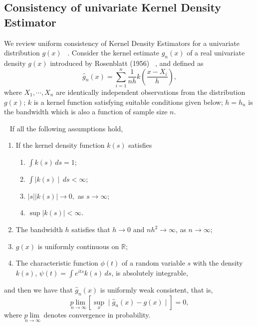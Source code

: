 \subsection{Consistency of univariate Kernel Density Estimator }
We review uniform consistency of Kernel Density Estimators for a univariate distribution $g(x)$ ~\cite{Silverman1978a,Pagan1999}. Consider the kernel estimate $\widehat{g}_n(x)$ of a real univariate density $g(x)$ introduced by Rosenblatt (1956) ~\cite{Silverman1978a,Pagan1999},  and defined as 
$$\widehat{g}_n(x) = \sum_{i=1}^{n} \frac{1}{nh} k\left( \frac{x-X_i}{h}\right),$$
where $X_1, \cdots, X_n$ are identically independent observations from the  distribution $g(x)$; $k$ is a kernel function satisfying suitable conditions given below; $h = h_n$ is the bandwidth which is also a function of sample size $n$.
\begin{theorem}~\cite{Pagan1999,Silverman1978a}
	If all the following assumptions hold,
	\begin{enumerate}
		\item If the kernel density function $k(s)$ satisfies
		\begin{enumerate}
			\item $\int k(s)\,ds=1$;
			\item $\int \mid k(s) \mid \,ds<\infty$;
			\item $\left|s\right|\left|k(s)\right| \to 0,$ as $s \to \infty$;
			\item $\sup\left|k(s)\right|<\infty$.
		\end{enumerate}
		\item The bandwidth $h$ satisfies that $h \to 0$ and $nh^2 \to \infty$, as $n \to \infty$;
		\item $g(x)$ is uniformly continuous on $\mathbb{R}$;
		\item The characteristic function $\phi(t)$ of a random variable $s$ with the density $k(s)$,  $\psi(t) = \int e^{its} k(s)\,ds$, is absolutely integrable,
	\end{enumerate}
	and then we have that $\widehat{g}_n(x)$ is uniformly weak consistent, that is, 
	$$\underset{n \to \infty}{p\lim} \left[\underset{x}{\sup} \mid \widehat{g}_n(x) - g(x) \mid  \right] = 0,$$
	where $\underset{n \to \infty}{p\lim}$ denotes convergence in probability.
\end{theorem} 

